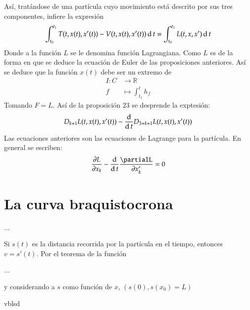 Así, tratándose de una partícula cuyo movimiento está descrito por sus tres
componentes, infiere la expresión
\[
  \int_{t_0}^{t_1} T(t,x(t),x'(t))-V(t,x(t),x'(t)) \diff t = \int_{t_0}^{t_1}%
  L(t,x,x') \diff t
\]
Donde a la función $L$ se le denomina función Lagrangiana. Como $L$ es de la
forma en que se deduce la ecuación de Euler de las proposiciones anteriores. 
Así se deduce que la función $x(t)$ debe ser un extremo de
\begin{align*}
  I: C &\to \mathbb{R} \\
  f &\mapsto \int_{t_1}^t h_f
\end{align*}
Tomando $F = L$. Así de la proposición 23 se desprende la exptesión:
\[
  D_{k+1}L(t,x(t),x'(t)) - \frac{\operatorname{d}}{\operatorname{d} t} D_{3+k+1} L(t,x(t),x'(t))
\]
Las ecuaciones anteriores son las ecuaciones de Lagrange para la partícula.
En general se escriben:
\[
  \frac{\partial L}{\partial x_k} - \frac{\diff}{\diff t} \frac{\partial%
  L}{\partial x'_k} = 0
\]
\section{La curva braquistocrona} 
...

Si $s(t)$ es la distancia recorrida por la partícula en el tiempo, entonces $v =
s'(t)$. Por el teorema de la función 

...

y considerando a $s$ como función de $x$, $(s(0), s(x_0) = L)$ 

vblsd


